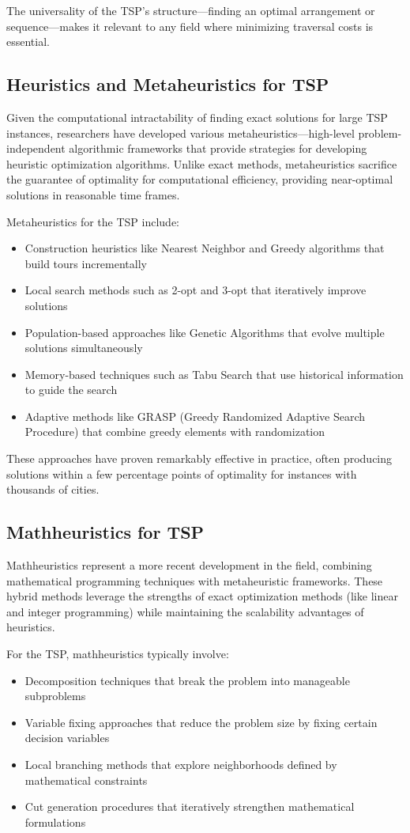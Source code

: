 \documentclass{article}
\begin{document}
The universality of the TSP's structure—finding an optimal arrangement or sequence—makes it relevant to any field where minimizing traversal costs is essential.

\subsection{Heuristics and Metaheuristics for TSP}
Given the computational intractability of finding exact solutions for large TSP instances, researchers have developed various metaheuristics—high-level problem-independent algorithmic frameworks 
that provide strategies for developing heuristic optimization algorithms. Unlike exact methods, metaheuristics sacrifice the guarantee of optimality for computational efficiency, providing near-optimal solutions in reasonable time frames.

Metaheuristics for the TSP include:
\begin{itemize}
	\item Construction heuristics like Nearest Neighbor and Greedy algorithms that build tours incrementally
	\item Local search methods such as 2-opt and 3-opt that iteratively improve solutions
	\item Population-based approaches like Genetic Algorithms that evolve multiple solutions simultaneously
	\item Memory-based techniques such as Tabu Search that use historical information to guide the search
	\item Adaptive methods like GRASP (Greedy Randomized Adaptive Search Procedure) that combine greedy elements with randomization
\end{itemize}

These approaches have proven remarkably effective in practice, often producing solutions within a few percentage points of optimality for instances with thousands of cities.

\subsection{Mathheuristics for TSP}
Mathheuristics represent a more recent development in the field, combining mathematical programming techniques with metaheuristic frameworks. 
These hybrid methods leverage the strengths of exact optimization methods (like linear and integer programming) while maintaining the scalability advantages of heuristics.

For the TSP, mathheuristics typically involve:
\begin{itemize}
	\item Decomposition techniques that break the problem into manageable subproblems
	\item Variable fixing approaches that reduce the problem size by fixing certain decision variables
	\item Local branching methods that explore neighborhoods defined by mathematical constraints
	\item Cut generation procedures that iteratively strengthen mathematical formulations
\end{itemize}
\end{document}
